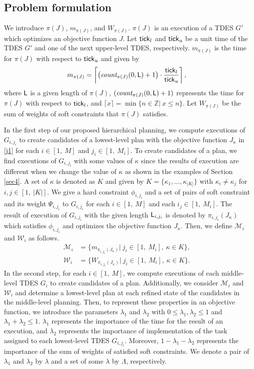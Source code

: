 \documentclass[journal,twoside,web]{IEEEtran}
\newcommand{\req}[1]{\eqref{#1}}
\newcommand{\rsec}[1]{Section\,\ref{#1}}
\newcommand{\tick}{{\sf tick}}
\newcommand{\Len}{{\sf L}}
\newcommand{\M}{\mathcal{M}}
\newcommand{\W}{\mathcal{W}}
\begin{document}
\subsection{Problem formulation}
%
We introduce $\pi(J)$, $m_{\pi(J)}$, and $W_{\pi(J)}$. 
$\pi(J)$ is an execution of a TDES $G'$ which optimizes an objective function $J$.
Let ${\tick}_{l}$ and ${\tick}_u$ be a unit time of the TDES $G'$ and one of the next upper-level TDES, respectively.
$m_{\pi(J)}$ is the time for $\pi(J)$ with respect to ${\tick}_{u}$ and given by
\begin{align}\label{ti}
m_{\pi(J)}=\left\lceil \left(\textit{count}_{\pi(J)}(0,\Len)+1\right)\cdot\frac{{\tick}_l}{{\tick}_{u}} \right\rceil,
\end{align}
where $\Len$ is a given length of $\pi(J)$, $(\textit{count}_{\pi(J)}(0,\Len)+1 )$ represents the time for $\pi(J)$ with respect to ${\tick}_l$, and $\lceil x \rceil =\min\{n\in\mathbb{Z}|\ x\leq n\}$.
Let $W_{\pi(J)}$ be the sum of weights of soft constraints that $\pi(J)$ satisfies.

In the first step of our proposed hierarchical planning, we compute executions of $G_{i,{j_i}}$ to create candidates of a lowest-level plan with the objective function $J_\kappa$ in \req{j1} for each $i\in[1,~M]$ and $j_i\in[1,~M_i]$.
%
%
To create candidates of a plan, we find executions of $G_{i,{j_i}}$ with some values of $\kappa$ since the results of execution are different when we change the value of $\kappa$ as shown in the examples of \rsec{sec4}.
%
A set of $\kappa$ is denoted as $K$ and given by
$K=\{\kappa_1,\ldots,\kappa_{|K|}\}$ with $\kappa_i\neq \kappa_j$ for $i,j\in [1,~|K|]$.
%
We give a hard constraint $\phi_{i,{j_i}}$ and a set of pairs of soft constraint and its weight $\Psi_{i,{j_i}}$ to $G_{i,{j_i}}$ for each $i\in[1,~M]$ and each $i_j\in[1,~M_i]$.
The result of execution of $G_{i,{j_i}}$ with the given length $\Len_{i,{j_i}}$ is denoted by $\pi_{i,{j_i}}(J_\kappa)$ which satisfies $\phi_{i,{j_i}}$ and optimizes the objective function $J_\kappa$.
%
%
Then, we define $\mathcal{M}_i$ and $\mathcal{W}_i$ as follows.
\begin{align}
\mathcal{M}_i&=\{m_{\pi_{i,{j_i}}(J_\kappa)}|~j_i\in[1,~M_i],~\kappa\in K\},\\
\mathcal{W}_i&=\{W_{\pi_{i,{j_i}}(J_\kappa)}|~j_i\in[1,~M_i],~\kappa\in K\}.
\end{align}
%
In the second step, for each $i\in[1,\ M]$, we compute executions of each middle-level TDES $G_i$ to create candidates of a plan.
Additionally, we consider $\M_i$ and $\W_i$ and determine a lowest-level plan at each refined state of the candidates in the middle-level planning. 
Then, to represent these properties in an objective function, we introduce the parameters $\lambda_1$ and $\lambda_2$ with $0\leq\lambda_1,{\lambda}_2\leq1$ and $\lambda_1+{\lambda}_2\leq1$.
$\lambda_1$ represents the importance of the time for the result of an execution, and $\lambda_2$ represents the importance of implementation of the task assigned to each lowest-level TDES $G_{i,{j_i}}$.
Moreover, $1-\lambda_1-\lambda_2$ represents the importance of the sum of weights of satisfied soft constraints.
We denote a pair of $\lambda_1$ and $\lambda_2$ by $\lambda$ and a set of some $\lambda$ by $\Lambda$, respectively.
\end{document}

